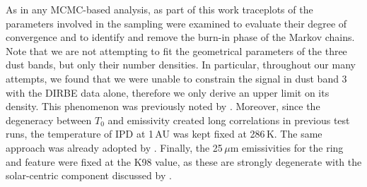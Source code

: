 \documentclass[twocolumn]{aa}
\begin{document}
As in any MCMC-based analysis, as part of this work traceplots of the 
parameters involved in the sampling were examined to evaluate their degree of convergence and to 
identify and remove the burn-in phase of the Markov chains. 
Note that we are not attempting to fit the geometrical parameters of the three dust bands, 
but only their number densities. In particular, throughout our many attempts, 
we found that we were unable to constrain the signal in dust band 3 with the DIRBE data alone, therefore 
we only derive an upper limit on its density. This phenomenon was previously noted by \citet{Spiesman}. 
Moreover, since the degeneracy between $T_0$ and emissivity created long 
correlations in previous test runs, the temperature of IPD at 1\,AU was 
kept fixed at 286\,K. The same approach was already adopted by \citet{kelsall1998}. 
Finally, the 25\,$\mu$m emissivities for the ring and feature were fixed at the K98 value, 
as these are strongly degenerate with the solar-centric component discussed by \citet{CG02_01}. 

%
\end{document}
